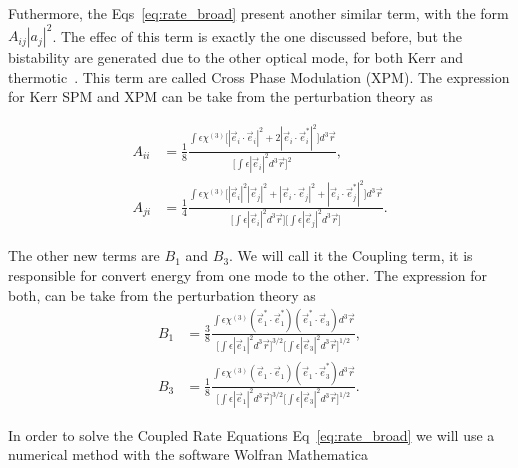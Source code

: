 Futhermore, the Eqs~\ref{eq:rate_broad} present another similar term, with the form $A_{ij}|a_j|^2$. The effec of this term is exactly the one discussed before, but the bistability are generated due to the other optical mode, for both Kerr and thermotic~\needcit. This term are called Cross Phase Modulation (XPM). The expression for Kerr SPM and XPM can be take from the perturbation theory as 


\begin{subequations}
    \begin{alignat}{1}
        A_{ii} &= \frac{1}{8}\frac{\int\epsilon\chi^{(3)}
        \Big[|\vec{e}_i\cdot\vec{e}_i|^2 + 2|\vec{e}_i\cdot\vec{e}_i^*|^2
        \Big]d^3\vec{r}}{\Big[\int \epsilon|\vec{e}_i|^2 d^3\vec{r}\Big]^2},
        \\
        A_{ji} &= \frac{1}{4}\frac{\int\epsilon\chi^{(3)}
        \Big[|\vec{e}_i|^2|\vec{e}_j|^2 + |\vec{e}_i\cdot\vec{e}_j|^2+ |\vec{e}_i\cdot\vec{e}_j^*|^2
        \Big]d^3\vec{r}}{\Big[\int \epsilon|\vec{e}_i|^2 d^3\vec{r}\Big]\Big[\int \epsilon|\vec{e}_j|^2 d^3\vec{r}\Big]}.
    \end{alignat}
\end{subequations}

The other new terms are $B_1$ and $B_3$.%
We will call it the Coupling term, it is responsible for convert energy from one mode to the other. The expression for both, can be take from the perturbation theory as
\begin{subequations}
    \begin{alignat}{1}
        B_{1} &= \frac{3}{8}\frac{\int\epsilon\chi^{(3)}
        (\vec{e}_1^*\cdot\vec{e}_1^*)(\vec{e}_1^*\cdot\vec{e}_3)
        d^3\vec{r}}{\Big[\int \epsilon|\vec{e}_1|^2 d^3\vec{r}\Big]^{3/2}\Big[\int \epsilon|\vec{e}_3|^2 d^3\vec{r}\Big]^{1/2}},
        \label{eq:coupling_b1}
        \\
        B_{3} &= \frac{1}{8}\frac{\int\epsilon\chi^{(3)}
        (\vec{e}_1\cdot\vec{e}_1)(\vec{e}_1\cdot\vec{e}^*_3)
        d^3\vec{r}}{\Big[\int \epsilon|\vec{e}_1|^2 d^3\vec{r}\Big]^{3/2}\Big[\int \epsilon|\vec{e}_3|^2 d^3\vec{r}\Big]^{1/2}}.
        \label{eq:coupling_b3}
    \end{alignat}
    \label{eq:coupling}
\end{subequations}

In order to solve the Coupled Rate Equations Eq~\ref{eq:rate_broad} we will use a numerical method with the software Wolfran Mathematica~\regmark

